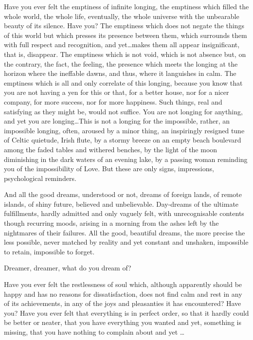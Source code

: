 \pa
Have you ever felt the emptiness of infinite longing, the
emptiness which filled the whole world, the whole life, eventually,
the whole universe with the unbearable beauty of its silence.  Have
you?  The emptiness which does not negate the things of this world but
which presses its presence between them, which surrounds them with
full respect and recognition, and yet\ldots makes them all appear
insignificant, that is, disappear.  The emptiness which is not void,
which is not absence but, on the contrary, the fact, the feeling, the
presence which meets the longing at the horizon where the ineffable
dawns, and thus, where it languishes in calm.  The emptiness which is
all and only correlate of this longing, because you know that you are
not having a yen for this or that, for a better house, nor for a nicer
company, for more success, nor for more happiness.  Such things, real
and satisfying as they might be, would not suffice.  You are not
longing for anything, and yet you are longing\ldots This is not a
longing for the impossible, rather, an impossible longing, often,
aroused by a minor thing, an inspiringly resigned tune of Celtic
quietude, Irish flute, by a stormy breeze on an empty beach boulevard
among the faded tables and withered benches, by the light of the moon
diminishing in the dark waters of an evening lake, by a passing woman
reminding you of the impossibility of Love.  But these are only signs, 
impressions, psychological reminders.

And all the good dreams, understood or not, dreams of foreign lands, of
remote islands, of shiny future, believed and unbelievable. Day-dreams of the
ultimate fulfillments, hardly admitted and only vaguely felt, with
unrecognisable contents though recurring moods, arising in a morning from the
ashes left by the nightmares of their failures.  All the good, beautiful dreams,
the more precise the less possible, never matched by reality and yet constant
and unshaken, impossible to retain, impossible to forget.

Dreamer, dreamer, what do you dream of?

\pa Have you ever felt the restlessness
of soul which, although apparently should be happy and has no reasons
for dissatisfaction, does not find calm and rest in any of its
achievements, in any of the joys and pleasanties it has encountered? 
Have you?  Have you ever felt that everything is in perfect order, so
that it hardly could be better or neater, that you have everything
you wanted and yet, something is missing, that you have nothing to
complain about and yet \ldots

